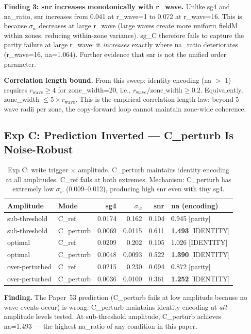 \documentclass[11pt,a4paper]{article}
\begin{document}
\textbf{Finding 3: snr increases monotonically with r\_wave.}
Unlike sg4 and na\_ratio, snr increases from 0.041 at r\_wave=1 to 0.072 at
r\_wave=16.
This is because $\sigma_w$ decreases at large r\_wave (large waves create more
uniform fieldM within zones, reducing within-zone variance).
sg\_C therefore fails to capture the parity failure at large r\_wave: it
\emph{increases} exactly where na\_ratio deteriorates (r\_wave=16, na=1.064).
Further evidence that snr is not the unified order parameter.

\textbf{Correlation length bound.}
From this sweep: identity encoding (na $>$ 1) requires $r_\text{wave} \geq 4$
for zone\_width=20, i.e., $r_\text{wave}/\text{zone\_width} \geq 0.2$.
Equivalently, zone\_width $\leq 5 \times r_\text{wave}$.
This is the empirical correlation length law: beyond 5 wave radii per zone,
the copy-forward loop cannot maintain zone-wide coherence.

\subsection{Exp C: Prediction Inverted --- C\_perturb Is Noise-Robust}

\begin{table}[h!]
\centering
\small
\begin{tabular}{llrrrl}
\toprule
Amplitude & Mode & sg4 & $\sigma_w$ & snr & na (encoding) \\
\midrule
sub-threshold & C\_ref & 0.0174 & 0.162 & 0.104 & 0.945 [parity] \\
sub-threshold & C\_perturb & 0.0069 & 0.0115 & 0.611 & \textbf{1.493} [IDENTITY] \\
optimal & C\_ref & 0.0209 & 0.202 & 0.105 & 1.026 [IDENTITY] \\
optimal & C\_perturb & 0.0048 & 0.0093 & 0.522 & \textbf{1.390} [IDENTITY] \\
over-perturbed & C\_ref & 0.0215 & 0.230 & 0.094 & 0.872 [parity] \\
over-perturbed & C\_perturb & 0.0036 & 0.0100 & 0.361 & \textbf{1.252} [IDENTITY] \\
\bottomrule
\end{tabular}
\caption{Exp C: write trigger $\times$ amplitude. C\_perturb maintains identity
encoding at all amplitudes. C\_ref fails at both extremes. Mechanism: C\_perturb
has extremely low $\sigma_w$ (0.009--0.012), producing high snr even with tiny
sg4.}
\end{table}

\textbf{Finding.}
The Paper~53 prediction (C\_perturb fails at low amplitude because no wave
events occur) is wrong.
C\_perturb maintains identity encoding at \emph{all} amplitude levels tested.
At sub-threshold amplitude, C\_perturb achieves na=1.493 --- the highest
na\_ratio of any condition in this paper.
\end{document}
